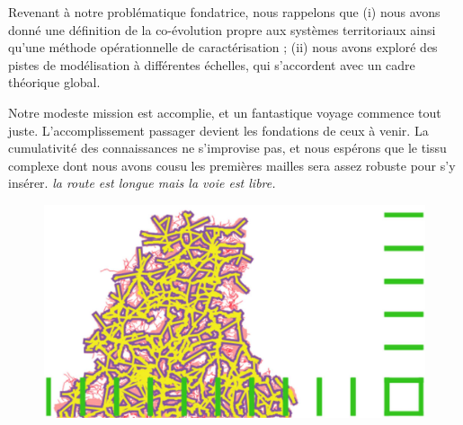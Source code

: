 Revenant à notre problématique fondatrice, nous rappelons que (i) nous avons donné une définition de la co-évolution propre aux systèmes territoriaux ainsi qu'une méthode opérationnelle de caractérisation ; (ii) nous avons exploré des pistes de modélisation à différentes échelles, qui s'accordent avec un cadre théorique global. 


Notre modeste mission est accomplie, et un fantastique voyage commence tout juste. L'accomplissement passager devient les fondations de ceux à venir. La cumulativité des connaissances ne s'improvise pas, et nous espérons que le tissu complexe dont nous avons cousu les premières mailles sera assez robuste pour s'y insérer. \textit{la route est longue mais la voie est libre.}




\stars




















\begin{figure}
	\includegraphics[width=\textheight,angle=90]{Figures/Final/CL-artwork.jpg}
\end{figure}











